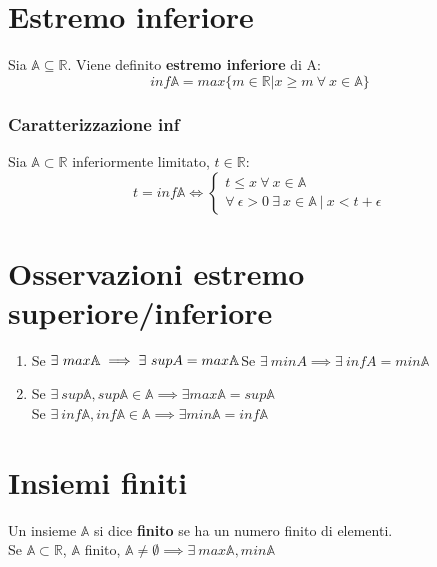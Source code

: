 \section{Estremo inferiore}
Sia $\mathbb{A} \subseteq \mathbb{R}$. Viene definito \textbf{estremo inferiore} di A:
\begin{equation}
inf\mathbb{A} = max\{m \in \mathbb{R} | x \geq m\ \forall\ x \in \mathbb{A}\}
\end{equation}
\subsubsection{Caratterizzazione inf}
Sia $\mathbb{A} \subset \mathbb{R}$ inferiormente limitato, $t \in \mathbb{R}$:\\
\begin{equation}
	t=inf\mathbb{A} \iff
	\begin{cases}
	t \leq x\ \forall\ x \in \mathbb{A}\\
	\forall\ \epsilon > 0\ \exists\ x \in \mathbb{A}\ |\ x < t+\epsilon
	\end{cases}
\end{equation}

\section{Osservazioni estremo superiore/inferiore}
\begin{enumerate}
\item Se $\exists\ max\mathbb{A} \implies \exists\ supA=max\mathbb{A}\\
$Se $\exists\ minA \implies \exists\ infA=min\mathbb{A}$
\item Se $\exists\ sup\mathbb{A}, sup\mathbb{A} \in \mathbb{A} \implies \exists max\mathbb{A} = sup\mathbb{A}$\\
Se $\exists\ inf\mathbb{A}, inf\mathbb{A} \in \mathbb{A} \implies \exists min\mathbb{A} = inf\mathbb{A}$
\end{enumerate}

\section{Insiemi finiti}
Un insieme $\mathbb{A}$ si dice \textbf{finito} se ha un numero finito di elementi.\\
Se $\mathbb{A} \subset \mathbb{R}$, $\mathbb{A}$ finito, $\mathbb{A} \neq \emptyset \implies \exists\ max\mathbb{A}, min\mathbb{A}$

